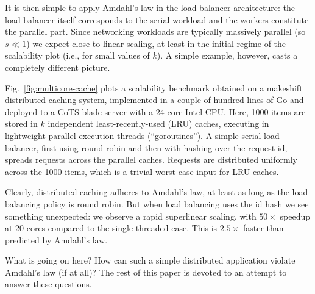 It is then simple to apply Amdahl's law in the load-balancer architecture: the load balancer itself corresponds to the serial workload and the workers constitute the parallel part. Since networking workloads are typically massively parallel (so $s \ll 1$) we expect close-to-linear scaling, at least in the initial regime of the scalability plot (i.e., for small values of $k$). A simple example, however, casts a completely different picture.

Fig.~\ref{fig:multicore-cache} plots a scalability benchmark obtained on a makeshift distributed caching system, implemented in a couple of hundred lines of Go and deployed to a CoTS blade server with a 24-core Intel CPU. %
Here, 1000 items are stored in $k$ independent least-recently-used (LRU) caches, executing in lightweight parallel execution threads (``goroutines''). A simple serial load balancer, first using round robin and then with hashing over the request id, spreads requests across the parallel caches. Requests are distributed uniformly across the 1000 items, which is a trivial worst-case input for LRU caches.

Clearly, distributed caching adheres to Amdahl's law, at least as long as the load balancing policy is round robin. But when load balancing uses the id hash we see something unexpected: we observe a rapid superlinear scaling, with $50\times$ speedup at 20 cores compared to the single-threaded case. This is $2.5\times$ faster than predicted by Amdahl's law.

What is going on here? How can such a simple distributed application violate Amdahl's law (if at all)? The rest of this paper is devoted to an attempt to answer these questions. %


